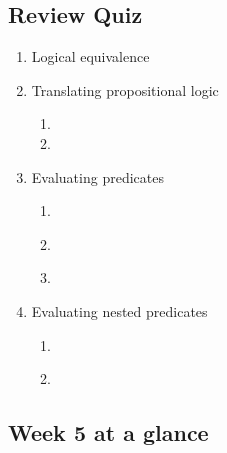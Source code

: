 \subsection*{Review Quiz}
\begin{enumerate}
\item Logical equivalence
 
\item Translating propositional logic
    \begin{enumerate}
    \item 
    \newpage
    \item 
    \end{enumerate}
\newpage
\item Evaluating predicates
    \begin{enumerate}
    \item \hspace{1in}\\ 
    \item \hspace{1in}\\ 
    \item \hspace{1in}\\ 
    \end{enumerate}
\newpage
\item Evaluating nested predicates
    \begin{enumerate}
    \item \hspace{1in}\\
    \item \hspace{1in}\\
    \end{enumerate}
\end{enumerate}

\newpage

\subsection*{Week 5 at a glance}

